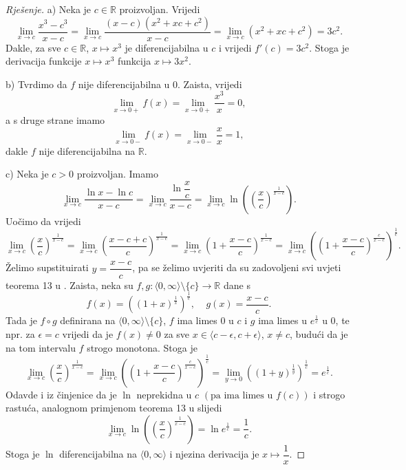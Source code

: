 \begin{proof}[Rješenje]
a) Neka je $c\in \mathbb{R}$ proizvoljan. Vrijedi
$$\lim\limits_{x\to c}{\dfrac{x^3-c^3}{x-c}}=\lim\limits_{x\to c}{\dfrac{(x-c)(x^2+xc+c^2)}{x-c}}=\lim\limits_{x\to c}{\left(x^2+xc+c^2\right)}=3c^2.$$
Dakle, za sve $c\in \mathbb{R}$, $x\mapsto x^3$ je diferencijabilna u $c$ i vrijedi $f'(c)=3c^2$. Stoga je derivacija funkcije $x\mapsto x^3$ funkcija $x\mapsto 3x^2$.

b) Tvrdimo da $f$ nije diferencijabilna u $0$. Zaista, vrijedi $$\lim\limits_{x\to 0+}{f(x)}=\lim\limits_{x\to 0+}{\dfrac{x^3}{x}}=0,$$
a s druge strane imamo 
$$\lim\limits_{x\to 0-}{f(x)}=\lim\limits_{x\to 0-}{\dfrac{x}{x}}=1,$$
dakle $f$ nije diferencijabilna na $\mathbb{R}$.

c) Neka je $c>0$ proizvoljan. Imamo
$$\lim\limits_{x\to c}{\dfrac{\ln{x}-\ln{c}}{x-c}}=\lim\limits_{x\to c}{\dfrac{\ln{\dfrac{x}{c}}}{x-c}}=\lim\limits_{x\to c}{\ln\left(\left(\dfrac{x}{c}\right)^\frac{1}{x-c}\right)}.$$
Uočimo da vrijedi
$$\lim\limits_{x\to c}{\left(\dfrac{x}{c}\right)^\frac{1}{x-c}}=\lim\limits_{x\to c}{\left(\dfrac{x-c+c}{c}\right)^\frac{1}{x-c}}=\lim\limits_{x\to c}{\left(1+\dfrac{x-c}{c}\right)^\frac{1}{x-c}}=\lim\limits_{x\to c}{\left(\left(1+\dfrac{x-c}{c}\right)^\frac{c}{x-c}\right)^\frac{1}{c}}.$$
Želimo supstituirati $y=\dfrac{x-c}{c}$, pa se želimo uvjeriti da su zadovoljeni svi uvjeti teorema 13 u \cite{14}. Zaista, neka su $f, g : \langle 0, \infty\rangle\setminus\{c\}\to \mathbb{R}$ dane s 
$$f(x)=\left((1+x)^\frac{1}{x}\right)^\frac{1}{c},\;\;\;\;g(x)=\dfrac{x-c}{c}.$$ 
Tada je $f\circ g$ definirana na $\langle 0, \infty\rangle\setminus\{c\}$, $f$ ima limes $0$ u $c$ i $g$ ima limes u $e^\frac{1}{c}$ u $0$, te npr. za $\epsilon=c$ vrijedi da je $f(x)\neq 0$ za sve $x\in \langle c-\epsilon, c+\epsilon\rangle$, $x\neq c$, budući da je na tom intervalu $f$ strogo monotona. Stoga je
$$\lim\limits_{x\to c}{\left(\dfrac{x}{c}\right)^\frac{1}{x-c}}=\lim\limits_{x\to c}{\left(\left(1+\dfrac{x-c}{c}\right)^\frac{c}{x-c}\right)^\frac{1}{c}}=\lim\limits_{y\to 0}{\left((1+y)^\frac{1}{y}\right)^\frac{1}{c}}=e^\frac{1}{c}.$$
Odavde i iz činjenice da je $\ln$ neprekidna u $c$ $\left(\text{pa ima limes u }f(c)\right)$ i strogo rastuća, analognom primjenom teorema 13 u \cite{14} slijedi
$$\lim\limits_{x\to c}{\ln\left(\left(\dfrac{x}{c}\right)^\frac{1}{x-c}\right)}=\ln{e^\frac{1}{c}}=\dfrac{1}{c}.$$
Stoga je $\ln$ diferencijabilna na $\langle 0, \infty\rangle$ i njezina derivacija je $x\mapsto \dfrac{1}{x}$.
\end{proof}
